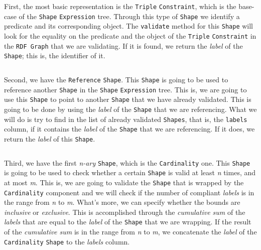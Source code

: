 First, the most basic representation is the \texttt{Triple} \texttt{Constraint}, which is the base-case of the \texttt{Shape} \texttt{Expression} tree. Through this type of \texttt{Shape} we identify a predicate and its corresponding object. The \texttt{validate} method for this \texttt{Shape} will look for the equality on the predicate and the object of the \texttt{Triple} \texttt{Constraint} in the \texttt{RDF Graph} that we are validating. If it is found, we return the \textit{label} of the \texttt{Shape}; this is, the identifier of it.

\begin{code}
    \inputminted{rust}{code/listings/11-10_triple.rs}
\end{code}

Second, we have the \texttt{Reference} \texttt{Shape}. This \texttt{Shape} is going to be used to reference another \texttt{Shape} in the \texttt{Shape} \texttt{Expression} tree. This is, we are going to use this \texttt{Shape} to point to another \texttt{Shape} that we have already validated. This is going to be done by using the \textit{label} of the \texttt{Shape} that we are referencing. What we will do is try to find in the list of already validated \texttt{Shapes}, that is, the \texttt{labels} column, if it contains the \textit{label} of the \texttt{Shape} that we are referencing. If it does, we return the \textit{label} of this \texttt{Shape}.

\begin{code}
    \inputminted{rust}{code/listings/11-11_reference.rs}
\end{code}

Third, we have the first \textit{n-ary} \texttt{Shape}, which is the \texttt{Cardinality} one. This \texttt{Shape} is going to be used to check whether a certain \texttt{Shape} is valid at least \textit{n} times, and at most \textit{m}. This is, we are going to validate the \texttt{Shape} that is wrapped by the \texttt{Cardinality} component and we will check if the number of compliant \textit{labels} is in the range from \textit{n} to \textit{m}. What's more, we can specify whether the bounds are \textit{inclusive} or \textit{exclusive}. This is accomplished through the \textit{cumulative sum} of the \textit{labels} that are equal to the \textit{label} of the \texttt{Shape} that we are wrapping. If the result of the \textit{cumulative sum} is in the range from \textit{n} to \textit{m}, we concatenate the \textit{label} of the \texttt{Cardinality} \texttt{Shape} to the \textit{labels} column.

